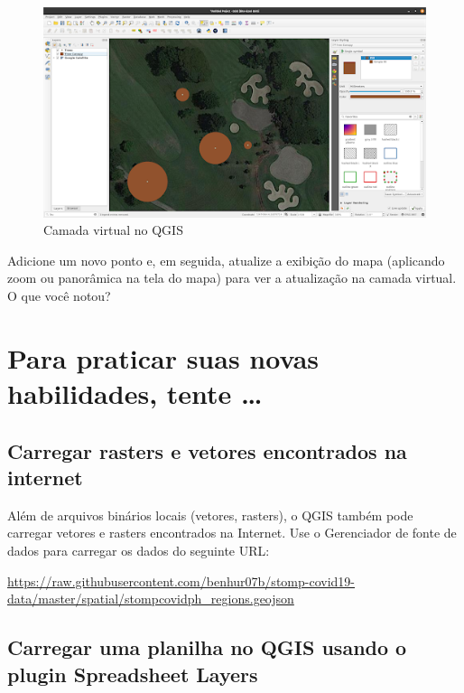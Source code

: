 \documentclass[
  portuguese,
]{krantz}
\begin{document}
\begin{figure}
\centering
\includegraphics{media/modulo2/virtual-6.png}
\caption{Camada virtual no QGIS}
\end{figure}

Adicione um novo ponto e, em seguida, atualize a exibição do mapa (aplicando zoom ou panorâmica na tela do mapa) para ver a atualização na camada virtual. O que você notou?

\hypertarget{para-praticar-suas-novas-habilidades-tente-1}{%
\section{Para praticar suas novas habilidades, tente \ldots{}}\label{para-praticar-suas-novas-habilidades-tente-1}}

\hypertarget{carregar-rasters-e-vetores-encontrados-na-internet}{%
\subsection{\texorpdfstring{\textbf{Carregar rasters e vetores encontrados na internet}}{Carregar rasters e vetores encontrados na internet}}\label{carregar-rasters-e-vetores-encontrados-na-internet}}

Além de arquivos binários locais (vetores, rasters), o QGIS também pode carregar vetores e rasters encontrados na Internet. Use o Gerenciador de fonte de dados para carregar os dados do seguinte URL:

\url{https://raw.githubusercontent.com/benhur07b/stomp-covid19-data/master/spatial/stompcovidph_regions.geojson}

\hypertarget{carregar-uma-planilha-no-qgis-usando-o-plugin-spreadsheet-layers}{%
\subsection{\texorpdfstring{\textbf{Carregar uma planilha no QGIS usando o plugin Spreadsheet Layers}}{Carregar uma planilha no QGIS usando o plugin Spreadsheet Layers}}\label{carregar-uma-planilha-no-qgis-usando-o-plugin-spreadsheet-layers}}
\end{document}
